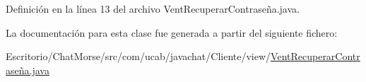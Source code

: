 Definición en la línea 13 del archivo Vent\-Recuperar\-Contraseña.\-java.



La documentación para esta clase fue generada a partir del siguiente fichero\-:\begin{DoxyCompactItemize}
\item 
Escritorio/\-Chat\-Morse/src/com/ucab/javachat/\-Cliente/view/\hyperlink{_vent_recuperar_contrase_xC3_xB1a_8java}{Vent\-Recuperar\-Contraseña.\-java}\end{DoxyCompactItemize}
